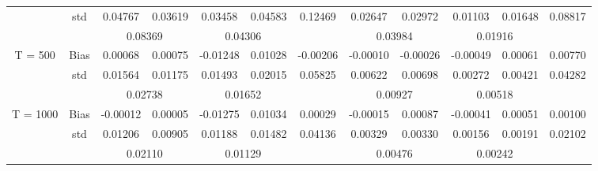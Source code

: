 \documentclass[a4paper,12pt,times,numbered,print,index]{report}
\numberwithin{equation}{section}
\begin{document}
\begin{table}[htbp]
\begin{adjustbox}{max width=\textwidth}
\begin{tabular}{cccccccccccc}
				& std   & 0.04767 & 0.03619 & 0.03458 & 0.04583 & 0.12469 & 0.02647 & 0.02972 & 0.01103 & 0.01648 & 0.08817 \\
				&       & \multicolumn{2}{c}{0.08369} & \multicolumn{2}{c}{0.04306} &       & \multicolumn{2}{c}{0.03984} & \multicolumn{2}{c}{0.01916} &  \\
				\multirow{3}[0]{*}{T = 500} & Bias  & 0.00068 & 0.00075 & -0.01248 & 0.01028 & -0.00206 & -0.00010 & -0.00026 & -0.00049 & 0.00061 & 0.00770 \\
				& std   & 0.01564 & 0.01175 & 0.01493 & 0.02015 & 0.05825 & 0.00622 & 0.00698 & 0.00272 & 0.00421 & 0.04282 \\
				&       & \multicolumn{2}{c}{0.02738} & \multicolumn{2}{c}{0.01652} &       & \multicolumn{2}{c}{0.00927} & \multicolumn{2}{c}{0.00518} &  \\
				\multirow{3}[1]{*}{T = 1000} & Bias  & -0.00012 & 0.00005 & -0.01275 & 0.01034 & 0.00029 & -0.00015 & 0.00087 & -0.00041 & 0.00051 & 0.00100 \\
				& std   & 0.01206 & 0.00905 & 0.01188 & 0.01482 & 0.04136 & 0.00329 & 0.00330 & 0.00156 & 0.00191 & 0.02102 \\
				&       & \multicolumn{2}{c}{0.02110} & \multicolumn{2}{c}{0.01129} &       & \multicolumn{2}{c}{0.00476} & \multicolumn{2}{c}{0.00242} &  \\
				\bottomrule
				\bottomrule
			\end{tabular}%
		\end{adjustbox}
		\label{tab:s_f12}%
	\end{table}%
	
\end{document}
